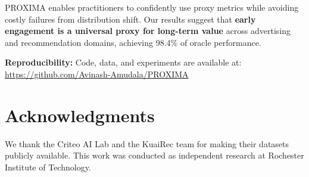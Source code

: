 \documentclass[11pt,twocolumn]{article}
\begin{document}
PROXIMA enables practitioners to confidently use proxy metrics while avoiding costly failures from distribution shift. Our results suggest that \textbf{early engagement is a universal proxy for long-term value} across advertising and recommendation domains, achieving 98.4\% of oracle performance.

\textbf{Reproducibility:} Code, data, and experiments are available at: \url{https://github.com/Avinash-Amudala/PROXIMA}

\section*{Acknowledgments}

We thank the Criteo AI Lab and the KuaiRec team for making their datasets publicly available. This work was conducted as independent research at Rochester Institute of Technology.
\end{document}
